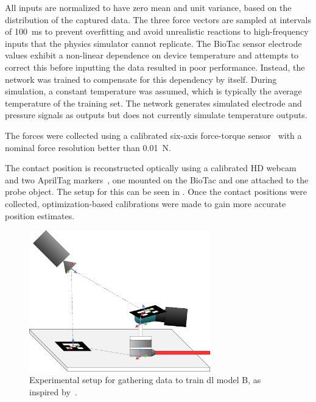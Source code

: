 All inputs are normalized to have zero mean and unit variance, based on the distribution of the captured data. The three force vectors are sampled at intervals of \SI{100}{\milli\second} to prevent overfitting and avoid unrealistic reactions to high-frequency inputs that the physics simulator cannot replicate. The BioTac sensor electrode values exhibit a non-linear dependence on device temperature and attempts to correct this before inputting the data resulted in poor performance. Instead, the network was trained to compensate for this dependency by itself. During simulation, a constant temperature was assumed, which is typically the average temperature of the training set. The network generates simulated electrode and pressure signals as outputs but does not currently simulate temperature outputs. \medskip

The forces were collected using a calibrated six-axis force-torque sensor~\cite{ati:-6-axis-force-and-torque-sensor-nano17-series} with a nominal force resolution better than \SI{0.01}{\newton}. 

The contact position is reconstructed optically using a calibrated HD webcam and two AprilTag markers~\cite{apriltag:-a-robust-and-flexible-visual-fiducial-system}, one mounted on the BioTac and one attached to the probe object. The setup for this can be seen in . Once the contact positions were collected, optimization-based calibrations were made to gain more accurate position estimates.

\begin{figure}[h]
	\begin{center}
		\includegraphics[width=0.7\textwidth]{chapters/1-tactile-perception/fig/biotac-sim-experimental-setup.pdf}
	\end{center}
	\caption{Experimental setup for gathering data to train \gls{dl} model B, as inspired by~\cite{simulation-of-the-syntouch-biotac-sensor}.}
	\label{fig:biotac-sim-experimental-setup}
\end{figure}

